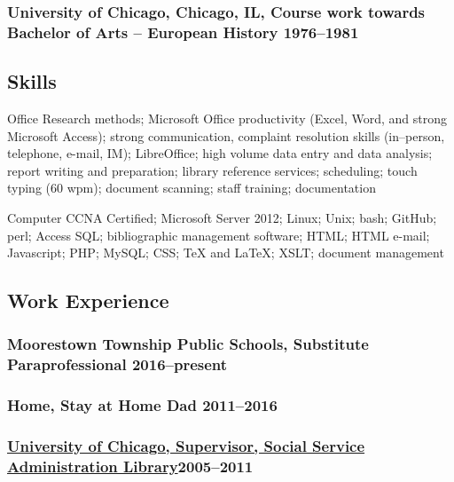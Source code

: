 \documentclass[lettersize,12pt,]{article}
\begin{document}
\subsubsection{University of Chicago, Chicago, IL, Course work towards Bachelor of Arts -- European History \hfill 1976--1981}





\subsection{Skills}\label{skills}
\begin{compactdesc}

\item[Office] Research methods; Microsoft Office productivity (Excel, Word, and strong Microsoft Access); strong communication, complaint resolution skills (in--person, telephone, e-mail, IM); LibreOffice; high volume data entry and data analysis; report writing and preparation; library reference services; scheduling; touch typing (60 wpm); document scanning; staff training; documentation

\item[Computer] CCNA Certified; Microsoft Server 2012; Linux; Unix; bash; GitHub; perl; Access SQL; bibliographic management software; HTML; HTML e-mail; Javascript; PHP; MySQL; CSS; TeX and LaTeX; XSLT; document management

\end{compactdesc}


\subsection{Work Experience}


\subsubsection{Moorestown Township Public Schools, Substitute Paraprofessional  \hfill 2016--present}





\subsubsection{Home, Stay at Home Dad  \hfill 2011--2016}





\subsubsection{\href{http://lib.uchicago.edu/e/ssa}{University of Chicago, Supervisor, Social Service Administration Library}\hfill 2005--2011}
\end{document}
